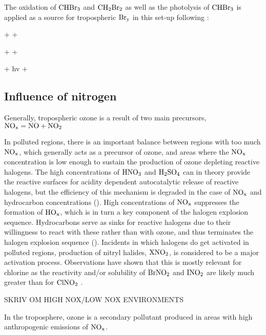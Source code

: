 \medskip

The oxidation of $\mathrm{CHBr_3}$ and $\mathrm{CH_2Br_2}$ as well as the photolysis of $\mathrm{CHBr_3}$ is applied as a source for tropospheric $\mathrm{Br_y}$ in this set-up following \cite{Parella}:


\begin{reaction}
     +   + 
    \label{R:10}
\end{reaction} 
\begin{reaction}
     +   + 
    \label{R:11}
\end{reaction}
\begin{reaction}
     + hv  + 
    \label{R:12}
\end{reaction}




\subsection{Influence of nitrogen}


Generally, tropospheric ozone is a result of two main precursors, $\mathrm{NO_x} = \mathrm{NO} + \mathrm{NO_2}$

In polluted regions, there is an important balance between regions with too much $\mathrm{NO_x}$, which generally acts as a precursor of ozone, and areas where the $\mathrm{NO_x}$ concentration is low enough to sustain the production of ozone depleting reactive halogens. The high concentrations of $\mathrm{HNO_3}$ and $\mathrm{H_2SO_4}$ can in theory provide the reactive surfaces for acidity dependent autocatalytic release of reactive halogens, but the efficiency of this mechanism is degraded in the case of $\mathrm{NO_x}$ and hydrocarbon concentrations (\cite{Simpson2015}). High concentrations of $\mathrm{NO_x}$ suppresses the formation of $\mathrm{HO_x}$, which is in turn a key component of the halogen explosion sequence. Hydrocarbons serve as sinks for reactive halogens due to their willingness to react with these rather than with ozone, and thus terminates the halogen explosion sequence (\cite{Simpson2015}). Incidents in which halogens do get activated in polluted regions, production of nitryl halides, $\mathrm{XNO_2}$, is considered to be a major activation process. Observations have shown that this is mostly relevant for chlorine as the reactivity and/or solubility of $\mathrm{BrNO_2}$ and $\mathrm{INO_2}$ are likely much greater than for $\mathrm{ClNO_2}$ \cite{Simpson2015}. 

\medskip





\cite{SeinfeldSpyros} SKRIV OM HIGH NOX/LOW NOX ENVIRONMENTS

In the troposphere, ozone is a secondary pollutant produced in areas with high anthropogenic emissions of $\mathrm{NO_x}$. 